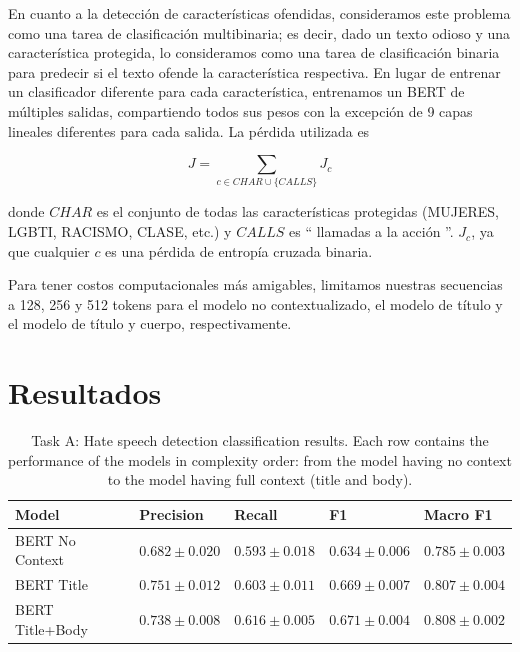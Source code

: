 En cuanto a la detección de características ofendidas, consideramos este problema como una tarea de clasificación multibinaria; es decir, dado un texto odioso y una característica protegida, lo consideramos como una tarea de clasificación binaria para predecir si el texto ofende la característica respectiva. En lugar de entrenar un clasificador diferente para cada característica, entrenamos un BERT de múltiples salidas, compartiendo todos sus pesos con la excepción de 9 capas lineales diferentes para cada salida. La pérdida utilizada es

\begin{equation*}
    J = \sum\limits_{c \in CHAR \cup \{CALLS\}} J_c
\end{equation*}

donde $CHAR$ es el conjunto de todas las características protegidas (MUJERES, LGBTI, RACISMO, CLASE, etc.) y $CALLS$ es `` llamadas a la acción ''. $ J_c $, ya que cualquier $ c $ es una pérdida de entropía cruzada binaria.

Para tener costos computacionales más amigables, limitamos nuestras secuencias a 128, 256 y 512 tokens para el modelo no contextualizado, el modelo de título y el modelo de título y cuerpo, respectivamente.


\section{Resultados}


\begin{table}[ht!]
    \centering
    \begin{tabular}{lllll}
        \toprule
        Model &          Precision &             Recall &                 F1 &           Macro F1 \\
        \midrule
        BERT No Context &  $0.682 \pm 0.020$ &  $0.593 \pm 0.018$ &  $0.634 \pm 0.006$ &  $0.785 \pm 0.003$ \\
        BERT Title      &  $0.751 \pm 0.012$ &  $0.603 \pm 0.011$ &  $0.669 \pm 0.007$ &  $0.807 \pm 0.004$ \\
        BERT Title+Body &  $0.738 \pm 0.008$ &  $0.616 \pm 0.005$ &  $0.671 \pm 0.004$ &  $0.808 \pm 0.002$ \\
        \bottomrule
    \end{tabular}


    \caption{Task A: Hate speech detection classification results. Each row contains the performance of the models in complexity order: from the model having no context to the model having full context (title and body). }
    \label{tab:task_a_results}
\end{table}


